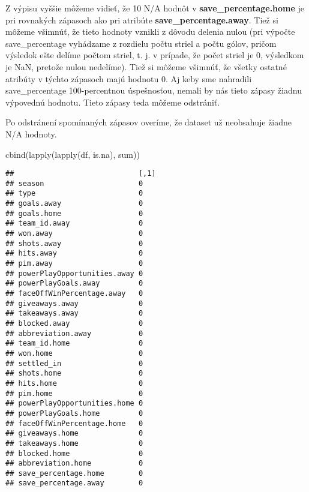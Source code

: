 \documentclass[
]{article}
\newenvironment{Shaded}{\begin{snugshade}}{\end{snugshade}}
\newcommand{\FunctionTok}[1]{\textcolor[rgb]{0.00,0.00,0.00}{#1}}
\newcommand{\NormalTok}[1]{#1}
\newcommand{\OtherTok}[1]{\textcolor[rgb]{0.56,0.35,0.01}{#1}}
\newcommand{\SpecialCharTok}[1]{\textcolor[rgb]{0.00,0.00,0.00}{#1}}
\begin{document}
Z výpisu vyššie môžeme vidieť, že 10 N/A hodnôt v
\textbf{save\_percentage.home} je pri rovnakých zápasoch ako pri
atribúte \textbf{save\_percentage.away}. Tiež si môžeme všimnúť, že
tieto hodnoty vznikli z dôvodu delenia nulou (pri výpočte
save\_percentage vyhádzame z rozdielu počtu striel a počtu gólov, pričom
výsledok ešte delíme počtom striel, t. j. v prípade, že počet striel je
0, výsledkom je NaN, pretože nulou nedelíme). Tiež si môžeme všimnúť, že
všetky ostatné atribúty v týchto zápasoch majú hodnotu 0. Aj keby sme
nahradili save\_percentage 100-percentnou úspešnosťou, nemali by nás
tieto zápasy žiadnu výpovednú hodnotu. Tieto zápasy teda môžeme
odstrániť.

\begin{Shaded}
\end{Shaded}

Po odstránení spomínaných zápasov overíme, že dataset už neobsahuje
žiadne N/A hodnoty.

\begin{Shaded}
\begin{Highlighting}[]
\FunctionTok{cbind}\NormalTok{(}\FunctionTok{lapply}\NormalTok{(}\FunctionTok{lapply}\NormalTok{(df, is.na), sum))}
\end{Highlighting}
\end{Shaded}

\begin{verbatim}
##                             [,1]
## season                      0   
## type                        0   
## goals.away                  0   
## goals.home                  0   
## team_id.away                0   
## won.away                    0   
## shots.away                  0   
## hits.away                   0   
## pim.away                    0   
## powerPlayOpportunities.away 0   
## powerPlayGoals.away         0   
## faceOffWinPercentage.away   0   
## giveaways.away              0   
## takeaways.away              0   
## blocked.away                0   
## abbreviation.away           0   
## team_id.home                0   
## won.home                    0   
## settled_in                  0   
## shots.home                  0   
## hits.home                   0   
## pim.home                    0   
## powerPlayOpportunities.home 0   
## powerPlayGoals.home         0   
## faceOffWinPercentage.home   0   
## giveaways.home              0   
## takeaways.home              0   
## blocked.home                0   
## abbreviation.home           0   
## save_percentage.home        0   
## save_percentage.away        0
\end{verbatim}
\end{document}
